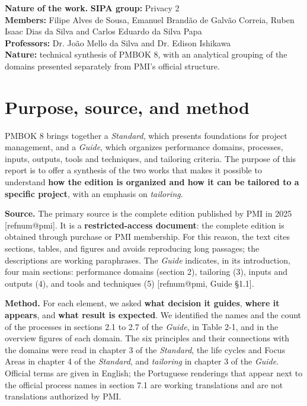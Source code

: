\documentclass[11pt,a4paper]{article}
\makeatletter
\newcommand{\refnum}[1]{\csname refnum@#1\endcsname}
\newcommand{\SingleSpacing}{}
\newcommand{\onelineskip}{\baselineskip}
\makeatother
\begin{document}
\tableofcontents
\bigskip
\listoffigures
\bigskip
\listoftables
\clearpage
{}
\setcounter{table}{0}

\begin{flushleft}\small\SingleSpacing
\noindent\textbf{Nature of the work.} \textbf{SIPA group:} Privacy 2\\ \textbf{Members:} Filipe Alves de Sousa, Emanuel Brandão de Galvão Correia, Ruben Isaac Dias da Silva and Carlos Eduardo da Silva Papa\\ \textbf{Professors:} Dr. João Mello da Silva and Dr. Edison Ishikawa\\ \textbf{Nature:} technical synthesis of PMBOK 8, with an analytical grouping of the domains presented separately from PMI's official structure.
\end{flushleft}
\vspace{\onelineskip}

\section{Purpose, source, and method}

PMBOK 8 brings together a \textit{Standard}, which presents foundations for project management, and a \textit{Guide}, which organizes performance domains, processes, inputs, outputs, tools and techniques, and tailoring criteria. The purpose of this report is to offer a synthesis of the two works that makes it possible to understand \textbf{how the edition is organized and how it can be tailored to a specific project}, with an emphasis on \textit{tailoring}.

\textbf{Source.} The primary source is the complete edition published by PMI in 2025 [\refnum{pmi}]. It is a \textbf{restricted-access document}: the complete edition is obtained through purchase or PMI membership. For this reason, the text cites sections, tables, and figures and avoids reproducing long passages; the descriptions are working paraphrases. The \textit{Guide} indicates, in its introduction, four main sections: performance domains (section 2), tailoring (3), inputs and outputs (4), and tools and techniques (5) [\refnum{pmi}, Guide §1.1].

\textbf{Method.} For each element, we asked \textbf{what decision it guides}, \textbf{where it appears}, and \textbf{what result is expected}. We identified the names and the count of the processes in sections 2.1 to 2.7 of the \textit{Guide}, in Table 2-1, and in the overview figures of each domain. The six principles and their connections with the domains were read in chapter 3 of the \textit{Standard}, the life cycles and Focus Areas in chapter 4 of the \textit{Standard}, and \textit{tailoring} in chapter 3 of the \textit{Guide}. Official terms are given in English; the Portuguese renderings that appear next to the official process names in section 7.1 are working translations and are not translations authorized by PMI.
\end{document}
